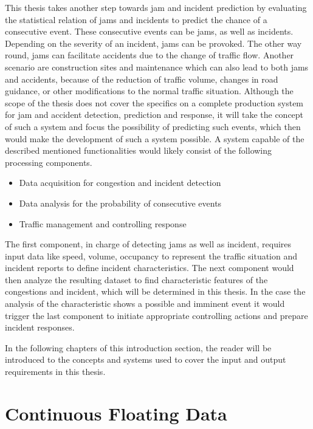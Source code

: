 \documentclass[a4paper,12pt]{report}
\begin{document}
\bigskip

This thesis takes another step towards \gls{jam} and incident prediction by evaluating the statistical relation of \glspl{jam} and incidents to predict the chance of a consecutive event. These consecutive events can be \glspl{jam}, as well as incidents. Depending on the severity of an incident, \glspl{jam} can be provoked. The other way round, \glspl{jam} can facilitate accidents due to the change of traffic flow. Another scenario are construction sites and maintenance which can also lead to both \glspl{jam} and accidents, because of the reduction of traffic volume, changes in road guidance, or other modifications to the normal traffic situation. Although the scope of the thesis does not cover the specifics on a complete production system for \gls{jam} and accident detection, prediction and response, it will take the concept of such a system and focus the possibility of predicting such events, which then would make the development of such a system possible. 
A system capable of the described mentioned functionalities would likely consist of the following processing components.

\begin{itemize}
  \item Data acquisition for congestion and incident detection
  \item Data analysis for the probability of consecutive events
  \item Traffic management and controlling response
\end{itemize}

The first component, in charge of detecting \glspl{jam} as well as incident, requires input data like speed, volume, occupancy to represent the traffic situation and incident reports to define incident characteristics. The next component would then analyze the resulting dataset to find characteristic features of the congestions and incident, which will be determined in this thesis. In the case the analysis of the characteristic shows a possible and imminent event it would trigger the last component to initiate appropriate controlling actions and prepare incident responses.

In the following chapters of this introduction section, the reader will be introduced to the concepts and systems used to cover the input and output requirements in this thesis.

\section{Continuous Floating Data}
\end{document}
